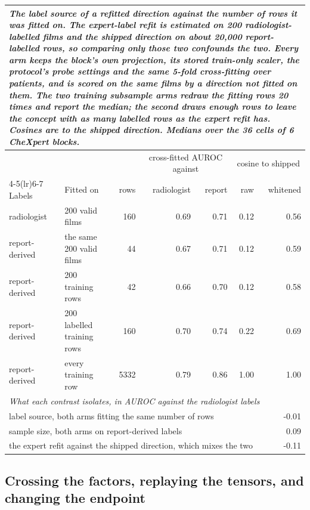 \documentclass{article}
\begin{document}
\begin{table}[h]
\medskip
\setlength{\tabcolsep}{4pt}
\begin{tabular}{llrrrrr}
\toprule
\multicolumn{7}{p{0.95\linewidth}}{\textit{The label source of a refitted direction against the number of rows it was fitted on. The expert-label refit is estimated on 200 radiologist-labelled films and the shipped direction on about 20{,}000 report-labelled rows, so comparing only those two confounds the two. Every arm keeps the block's own projection, its stored train-only scaler, the protocol's probe settings and the same 5-fold cross-fitting over patients, and is scored on the same films by a direction not fitted on them. The two training subsample arms redraw the fitting rows 20 times and report the median; the second draws enough rows to leave the concept with as many labelled rows as the expert refit has. Cosines are to the shipped direction. Medians over the 36 cells of 6 CheXpert blocks.}} \\
\midrule
 & & & \multicolumn{2}{c}{cross-fitted AUROC against} & \multicolumn{2}{c}{cosine to shipped} \\
\cmidrule(lr){4-5}\cmidrule(lr){6-7}
Labels & Fitted on & rows & radiologist & report & raw & whitened \\
\midrule
radiologist & 200 valid films & 160 & 0.69 & 0.71 & 0.12 & 0.56 \\
report-derived & the same 200 valid films & 44 & 0.67 & 0.71 & 0.12 & 0.59 \\
report-derived & 200 training rows & 42 & 0.66 & 0.70 & 0.12 & 0.58 \\
report-derived & 200 labelled training rows & 160 & 0.70 & 0.74 & 0.22 & 0.69 \\
report-derived & every training row & 5332 & 0.79 & 0.86 & 1.00 & 1.00 \\
\midrule
\multicolumn{7}{l}{\textit{What each contrast isolates, in AUROC against the radiologist labels}} \\
\midrule
\multicolumn{6}{l}{label source, both arms fitting the same number of rows} & -0.01 \\
\multicolumn{6}{l}{sample size, both arms on report-derived labels} & 0.09 \\
\multicolumn{6}{l}{the expert refit against the shipped direction, which mixes the two} & -0.11 \\
\bottomrule
\end{tabular}
\end{table}

\subsection{Crossing the factors, replaying the tensors, and changing the endpoint}
\label{app:cf-crossed}
\end{document}
